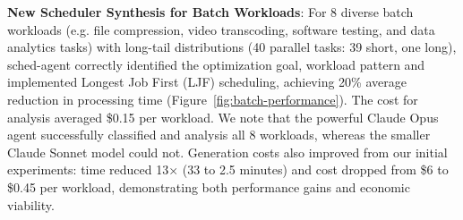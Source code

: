 \documentclass[preprint]{article}
\newcommand{\sys}{SchedCP\xspace}
\newcommand{\agent}{sched-agent\xspace}
\begin{document}
\textbf{New Scheduler Synthesis for Batch Workloads}: For 8 diverse batch workloads (e.g. file compression, video transcoding, software testing, and data analytics tasks) with long-tail distributions (40 parallel tasks: 39 short, one long), \agent correctly identified the optimization goal, workload pattern and implemented Longest Job First (LJF) scheduling, achieving 20\% average reduction in processing time (Figure~\ref{fig:batch-performance}). The cost for analysis averaged \$0.15 per workload. We note that the powerful Claude Opus agent successfully classified and analysis all 8 workloads, whereas the smaller Claude Sonnet model could not. Generation costs also improved from our initial experiments: time reduced 13× (33 to 2.5 minutes) and cost dropped from \$6 to \$0.45 per workload, demonstrating both performance gains and economic viability.






\end{document}
